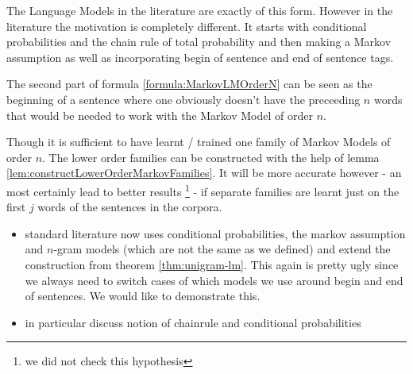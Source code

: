 \documentclass[•]{book}
\begin{document}
\begin{remark}
The Language Models in the literature are exactly of this form.
However in the literature the motivation is completely different. 
It starts with conditional probabilities and the chain rule of total probability and then making a Markov assumption as well as incorporating begin of sentence and end of sentence tags. 

The second part of formula \ref{formula:MarkovLMOrderN} can be seen as the beginning of a sentence where one obviously doesn't have the preceeding $n$ words that would be needed to work with the Markov Model of order $n$. 

Though it is sufficient to have learnt / trained  one family of Markov Models of order $n$. 
The lower order families can be constructed with the help of lemma \ref{lem:constructLowerOrderMarkovFamilies}. 
It will be more accurate however - an most certainly lead to better results \footnote{we did not check this hypothesis} - if separate families are learnt just on the first $j$ words of the sentences in the corpora.  


\end{remark}




\begin{itemize}
\item standard literature now uses conditional probabilities, the markov assumption and $n$-gram models (which are not the same as we defined) and extend the construction from theorem \ref{thm:unigram-lm}. This again is pretty ugly since we always need to switch cases of which models we use around begin and end of sentences. We would like to demonstrate this.
\item in particular discuss notion of chainrule and conditional probabilities
\end{itemize}
\end{document}
